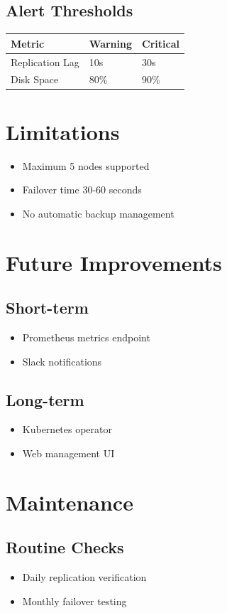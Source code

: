 \documentclass{article}
\begin{document}
\subsection{Alert Thresholds}
\begin{tabular}{|l|l|l|}
\hline
\textbf{Metric} & \textbf{Warning} & \textbf{Critical} \\
\hline
Replication Lag & 10s & 30s \\
Disk Space & 80\% & 90\% \\
\hline
\end{tabular}

\section{Limitations}
\begin{itemize}
\item Maximum 5 nodes supported
\item Failover time 30-60 seconds
\item No automatic backup management
\end{itemize}

\section{Future Improvements}
\subsection{Short-term}
\begin{itemize}
\item Prometheus metrics endpoint
\item Slack notifications
\end{itemize}

\subsection{Long-term}
\begin{itemize}
\item Kubernetes operator
\item Web management UI
\end{itemize}

\section{Maintenance}
\subsection{Routine Checks}
\begin{itemize}
\item Daily replication verification
\item Monthly failover testing
\end{itemize}
\end{document}
